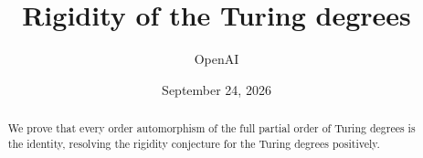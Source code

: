 \documentclass[11pt]{article}
\title{Rigidity of the Turing degrees}
\author{OpenAI}
\date{September 24, 2026}
\numberwithin{equation}{section}
\theoremstyle{remark}
\begin{document}
\maketitle
\begin{abstract}
We prove that every order automorphism of the full partial order of
Turing degrees is the identity, resolving the rigidity conjecture for
the Turing degrees positively.
\end{abstract}






\end{document}
